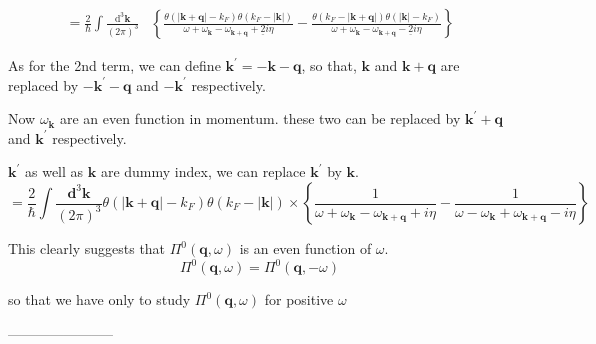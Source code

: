 \[\begin{split}=\frac{2}{\hbar} \int \frac{\mathrm{d}^3 \mathbf{k}}{(2\pi)^3}
 &\left\{  \frac{\theta(|\mathbf{k}+\mathbf{q}|-k_F)\theta(k_F - |\mathbf{k}|)}{\omega + \omega_{\mathbf{k}}- \omega_{\mathbf{k}+\mathbf{q}} +\underline{2}i \eta} - \frac{\theta(k_F - |\mathbf{k}+\mathbf{q}|) \theta(|\mathbf{k}|-k_F)}{\omega + \omega_{\mathbf{k}} - \omega_{\mathbf{k}+\mathbf{q}}-\underline{2}i \eta} \right\} 
 \end{split}\]

As for the 2nd term, we can define $\mathbf{k}^{'} = -\mathbf{k}-\mathbf{q}$, so that, $\mathbf{k}$ and $\mathbf{k} + \mathbf{q}$ are replaced by $-\mathbf{k}^{'}-\mathbf{q}$ and $-\mathbf{k}^{'}$ respectively.

Now $\omega_\mathbf{k}$ are an even function in momentum. these two can be replaced by $\mathbf{k}^{'} + \mathbf{q}$ and $\mathbf{k}^{'}$ respectively.

$\mathbf{k}^{'}$ as well as $\mathbf{k}$ are dummy index, we can replace $\mathbf{k}^{'}$ by $\mathbf{k}$.
\[=\frac{2}{\hbar} \int \frac{\mathbf{d}^3 \mathbf{k}}{(2\pi)^3}\theta(|\mathbf{k}+\mathbf{q}|-k_F)\theta(k_F - |\mathbf{k}|) \times \left\{ \frac{1}{\omega+\omega_{\mathbf{k}}- \omega_{\mathbf{k}+\mathbf{q}}+i \eta} - \frac{1}{\omega-\omega_{\mathbf{k}}+ \omega_{\mathbf{k}+\mathbf{q}}-i \eta} \right\}\]

This clearly suggests that $\Pi^0(\mathbf{q},\omega)$ is an even function of $\omega$.
\begin{equation} \label{Eqs2.8.14} \Pi^0(\mathbf{q},\omega) = \Pi^0(\mathbf{q},-\omega)\end{equation}

so that we have only to study $\Pi^0(\mathbf{q},\omega)$ for positive $\omega$
\begin{center}-----------------------\end{center}

